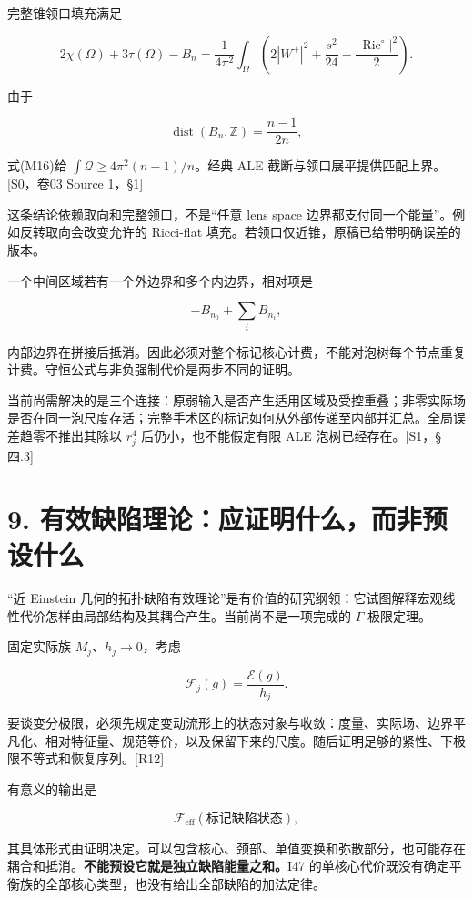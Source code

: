 \documentclass[UTF8,a4paper,11pt,fontset=fandol]{ctexart}
\begin{document}
完整锥领口填充满足

\[
2\chi(\Omega)+3\tau(\Omega)-B_n
=\frac1{4\pi^2}\int_\Omega
\left(2|W^+|^2+\frac{s^2}{24}-\frac{|\operatorname{Ric}^{\circ}|^2}{2}\right).
\tag{M16}
\]

由于

\[
\operatorname{dist}(B_n,\mathbb Z)=\frac{n-1}{2n},
\]

式(M16)给 \(\int\mathscr Q\ge4\pi^2(n-1)/n\)。经典 ALE
截断与领口展平提供匹配上界。{[}S0，卷03 Source 1，§1{]}

这条结论依赖取向和完整领口，不是``任意 lens space
边界都支付同一个能量''。例如反转取向会改变允许的 Ricci-flat
填充。若领口仅近锥，原稿已给带明确误差的版本。

一个中间区域若有一个外边界和多个内边界，相对项是

\[
-B_{n_0}+\sum_iB_{n_i},
\]

内部边界在拼接后抵消。因此必须对整个标记核心计费，不能对泡树每个节点重复计费。守恒公式与非负强制代价是两步不同的证明。

当前尚需解决的是三个连接：原弱输入是否产生适用区域及受控重叠；非零实际场是否在同一泡尺度存活；完整手术区的标记如何从外部传递至内部并汇总。全局误差趋零不推出其除以
\(r_j^4\) 后仍小，也不能假定有限 ALE 泡树已经存在。{[}S1，§四.3{]}

\section{9.
有效缺陷理论：应证明什么，而非预设什么}\label{ux6709ux6548ux7f3aux9677ux7406ux8bbaux5e94ux8bc1ux660eux4ec0ux4e48ux800cux975eux9884ux8bbeux4ec0ux4e48}

``近 Einstein
几何的拓扑缺陷有效理论''是有价值的研究纲领：它试图解释宏观线性代价怎样由局部结构及其耦合产生。当前尚不是一项完成的
\(\Gamma\) 极限定理。

固定实际族 \(M_j\)、\(h_j\to0\)，考虑

\[
\mathcal F_j(g)=\frac{\mathcal E(g)}{h_j}.
\]

要谈变分极限，必须先规定变动流形上的状态对象与收敛：度量、实际场、边界平凡化、相对特征量、规范等价，以及保留下来的尺度。随后证明足够的紧性、下极限不等式和恢复序列。{[}R12{]}

有意义的输出是

\[
\mathcal F_{\mathrm{eff}}(\text{标记缺陷状态}),
\]

其具体形式由证明决定。可以包含核心、颈部、单值变换和弥散部分，也可能存在耦合和抵消。\textbf{不能预设它就是独立缺陷能量之和。}I47
的单核心代价既没有确定平衡族的全部核心类型，也没有给出全部缺陷的加法定律。
\end{document}
